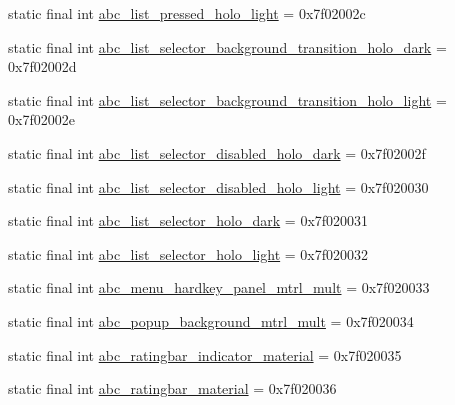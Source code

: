\begin{CompactItemize}
\item 
static final int \hyperlink{classandroid_1_1support_1_1v7_1_1mediarouter_1_1_r_1_1drawable_4d22f6b7ea1875323acb94266d5ca985}{abc\_\-list\_\-pressed\_\-holo\_\-light} = 0x7f02002c
\item 
static final int \hyperlink{classandroid_1_1support_1_1v7_1_1mediarouter_1_1_r_1_1drawable_e120f58c8bd971e8001438605b73a649}{abc\_\-list\_\-selector\_\-background\_\-transition\_\-holo\_\-dark} = 0x7f02002d
\item 
static final int \hyperlink{classandroid_1_1support_1_1v7_1_1mediarouter_1_1_r_1_1drawable_4cfeee925885c57cb2d318e1f0f8f06e}{abc\_\-list\_\-selector\_\-background\_\-transition\_\-holo\_\-light} = 0x7f02002e
\item 
static final int \hyperlink{classandroid_1_1support_1_1v7_1_1mediarouter_1_1_r_1_1drawable_fad867085cbad2551635576532a3b069}{abc\_\-list\_\-selector\_\-disabled\_\-holo\_\-dark} = 0x7f02002f
\item 
static final int \hyperlink{classandroid_1_1support_1_1v7_1_1mediarouter_1_1_r_1_1drawable_8acb5e0b87293cce6d4b990802bae397}{abc\_\-list\_\-selector\_\-disabled\_\-holo\_\-light} = 0x7f020030
\item 
static final int \hyperlink{classandroid_1_1support_1_1v7_1_1mediarouter_1_1_r_1_1drawable_82867d3328de54da9655ff17ef0b1c88}{abc\_\-list\_\-selector\_\-holo\_\-dark} = 0x7f020031
\item 
static final int \hyperlink{classandroid_1_1support_1_1v7_1_1mediarouter_1_1_r_1_1drawable_7139b6138fc1df397a6e2b69df6b61aa}{abc\_\-list\_\-selector\_\-holo\_\-light} = 0x7f020032
\item 
static final int \hyperlink{classandroid_1_1support_1_1v7_1_1mediarouter_1_1_r_1_1drawable_21ae121ae192b73aaf7af6171335bc0d}{abc\_\-menu\_\-hardkey\_\-panel\_\-mtrl\_\-mult} = 0x7f020033
\item 
static final int \hyperlink{classandroid_1_1support_1_1v7_1_1mediarouter_1_1_r_1_1drawable_84fb41d0f7e23ee96fad432bd0ee772a}{abc\_\-popup\_\-background\_\-mtrl\_\-mult} = 0x7f020034
\item 
static final int \hyperlink{classandroid_1_1support_1_1v7_1_1mediarouter_1_1_r_1_1drawable_5a959e47c1bf8fc729d464aa8723cdbe}{abc\_\-ratingbar\_\-indicator\_\-material} = 0x7f020035
\item 
static final int \hyperlink{classandroid_1_1support_1_1v7_1_1mediarouter_1_1_r_1_1drawable_0d97a434958f38476246776cf48a4e8f}{abc\_\-ratingbar\_\-material} = 0x7f020036
\item 

\end{CompactItemize}
